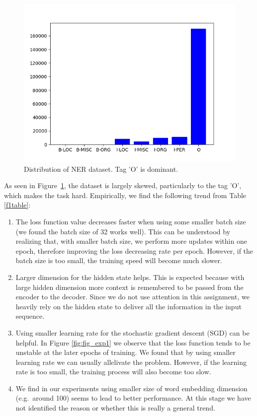 \documentclass[11pt,a4paper]{article}
\begin{document}
\begin{figure}[t]
\centering
   \includegraphics[width=0.8\linewidth]{NER_groundtruths.png}
   \caption{Distribution of NER dataset. Tag 'O' is dominant.}
\label{fig_ner_gt}
\end{figure}

As seen in Figure~\ref{fig_ner_gt}, the dataset is largely skewed, particularly to the tag 'O', which makes the task hard. Empirically, we find the following trend from Table \ref{f1table}:
\begin{enumerate}
	\item The loss function value decreases faster when using some smaller batch size (we found the batch size of 32 works well). This can be understood by realizing that, with smaller batch size, we perform more updates within one epoch, therefore improving the loss decreasing rate per epoch. However, if the batch size is too small, the training speed will become much slower.
    \item Larger dimension for the hidden state helps. This is expected because with large hidden dimension more context is remembered to be passed from the encoder to the decoder. Since we do not use attention in this assignment, we heavily rely on the hidden state to deliver all the information in the input sequence.
    \item Using smaller learning rate for the stochastic gradient descent (SGD) can be helpful. In Figure \ref{fig:fig_exp1} we observe that the loss function tends to be unstable at the later epochs of training. We found that by using smaller learning rate we can usually allelivate the problem. However, if the learning rate is too small, the training process will also become too slow.
    \item We find in our experiments using smaller size of word embedding dimension (e.g.~around 100) seems to lead to better performance. At this stage we have not identified the reason or whether this is really a general trend.
\end{enumerate}
\end{document}
